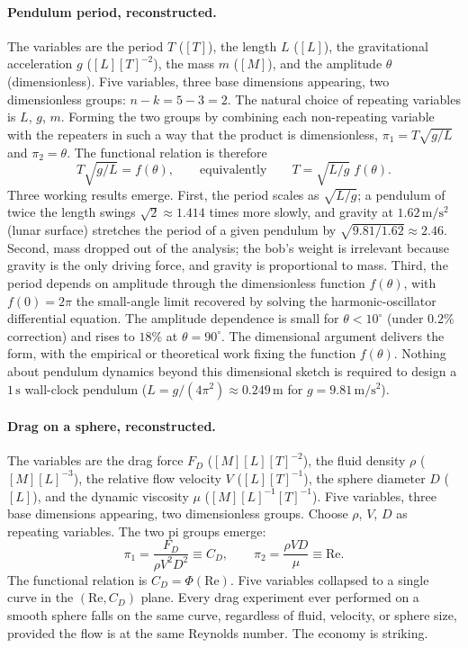 \paragraph{Pendulum period, reconstructed.} The variables are the
period $T$ ($[T]$), the length $L$ ($[L]$), the gravitational
acceleration $g$ ($[L][T]^{-2}$), the mass $m$ ($[M]$), and the
amplitude $\theta$ (dimensionless). Five variables, three base
dimensions appearing, two dimensionless groups: $n - k = 5 - 3 =
2$. The natural choice of repeating variables is $L$, $g$, $m$.
Forming the two groups by combining each non-repeating variable
with the repeaters in such a way that the product is
dimensionless, $\pi_{1} = T \sqrt{g/L}$ and $\pi_{2} = \theta$.
The functional relation is therefore
\[
T \sqrt{g/L} = f(\theta), \qquad\text{equivalently}\qquad
T = \sqrt{L/g}\; f(\theta).
\]
Three working results emerge. First, the period scales as
$\sqrt{L/g}$; a pendulum of twice the length swings $\sqrt{2}
\approx 1.414$ times more slowly, and gravity at $1.62 \,\si
{\meter\per\second\squared}$ (lunar surface) stretches the period
of a given pendulum by $\sqrt{9.81/1.62} \approx 2.46$. Second,
mass dropped out of the analysis; the bob's weight is irrelevant
because gravity is the only driving force, and gravity is
proportional to mass. Third, the period depends on amplitude
through the dimensionless function $f(\theta)$, with $f(0) = 2\pi$
the small-angle limit recovered by solving the harmonic-oscillator
differential equation. The amplitude dependence is small for
$\theta < 10^{\circ}$ (under $0.2\%$ correction) and rises to
$18\%$ at $\theta = 90^{\circ}$. The dimensional argument
delivers the form, with the empirical or theoretical work
fixing the function $f(\theta)$. Nothing about pendulum dynamics
beyond this dimensional sketch is required to design a
$1 \,\si{\second}$ wall-clock pendulum ($L = g/(4\pi^{2})
\approx 0.249 \,\si{\meter}$ for $g = 9.81 \,\si{\meter\per
\second\squared}$).

\paragraph{Drag on a sphere, reconstructed.} The variables are
the drag force $F_{D}$ ($[M][L][T]^{-2}$), the fluid density
$\rho$ ($[M][L]^{-3}$), the relative flow velocity $V$ ($[L]
[T]^{-1}$), the sphere diameter $D$ ($[L]$), and the dynamic
viscosity $\mu$ ($[M][L]^{-1}[T]^{-1}$). Five variables, three
base dimensions appearing, two dimensionless groups. Choose
$\rho$, $V$, $D$ as repeating variables. The two pi groups
emerge:
\[
\pi_{1} = \frac{F_{D}}{\rho V^{2} D^{2}} \equiv C_{D},
\qquad
\pi_{2} = \frac{\rho V D}{\mu} \equiv \mathrm{Re}.
\]
The functional relation is $C_{D} = \Phi(\mathrm{Re})$. Five
variables collapsed to a single curve in the $(\mathrm{Re},
C_{D})$ plane. Every drag experiment ever performed on a
smooth sphere falls on the same curve, regardless of fluid,
velocity, or sphere size, provided the flow is at the same
Reynolds number. The economy is striking.


